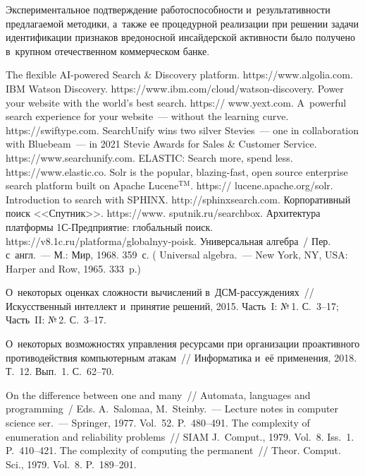 \begin{multicols}{2}
  Экспериментальное подтверждение ра\-бо\-то\-способности и~результативности 
предлагаемой методики, а~также ее процедурной реализации при решении 
задачи идентификации признаков вредоносной инсайдерской активности было 
получено в~крупном отечественном коммерческом банке.
  
{\small\frenchspacing
{%
\begin{thebibliography}{99}
The flexible AI-powered Search \& Discovery platform. {\sf https://www.algolia.com}.
IBM Watson Discovery. {\sf https://www.ibm.com/cloud/\linebreak watson-discovery}.
Power your website with the world's best search. {\sf https:// www.yext.com}.
A~powerful search experience for your website~--- without the learning curve. 
{\sf https://swiftype.com}.
SearchUnify wins two silver Stevies~--- one in collaboration with Bluebeam~--- in 2021 
Stevie Awards for Sales \& Customer Service. {\sf https://www.searchunify.com}.
ELASTIC: Search more, spend less. {\sf https://www.elastic.\linebreak co}.
Solr is the popular, blazing-fast, open source enterprise search platform built on Apache 
Lucene$^{\mathrm{TM}}$. {\sf https:// lucene.apache.org/solr}.
Introduction to search with SPHINX. {\sf http://\linebreak sphinxsearch.com}.
Корпоративный поиск <<Спутник>>. {\sf https://www. sputnik.ru/searchbox}. 
Архитектура платформы 1С-Предприятие: глобальный поиск. 
{\sf https://v8.1c.ru/platforma/globalnyy-poisk}. 
 Универсальная алгебра~/ Пер. с~англ.~--- М.: Мир, 1968. 359~с.
( {Universal algebra}.~--- New York, NY, USA: Harper and Row, 1965. 333~p.)

 О~некоторых оценках сложности вычислений в~ДСМ-рас\-суж\-де\-ни\-ях~// 
Искусственный интеллект и~принятие решений, 2015. Часть~I: №\,1. С.~3--17; Часть~II: №\,2. 
С.~3--17.

 О~некоторых 
возможностях управления ресурсами при организации проактивного противодействия 
компьютерным атакам~// Информатика и~её применения, 2018. Т.~12. Вып.~1. С.~62--70.

 On the difference between one and many~// Automata, languages and 
programming~/ Eds. A.~Salomaa, M.~Steinby.~---
 Lecture notes in computer science ser.~--- Springer, 1977. Vol.~52. P.~480--491. 
 The complexity of enumeration and reliability problems~// SIAM 
J.~Comput., 1979. Vol.~8. Iss.~1. P.~410--421.
 The complexity of computing the permanent~// Theor. Comput. Sci., 
1979. Vol.~8. P.~189--201.
  \end{thebibliography}

}
}

\end{multicols}

